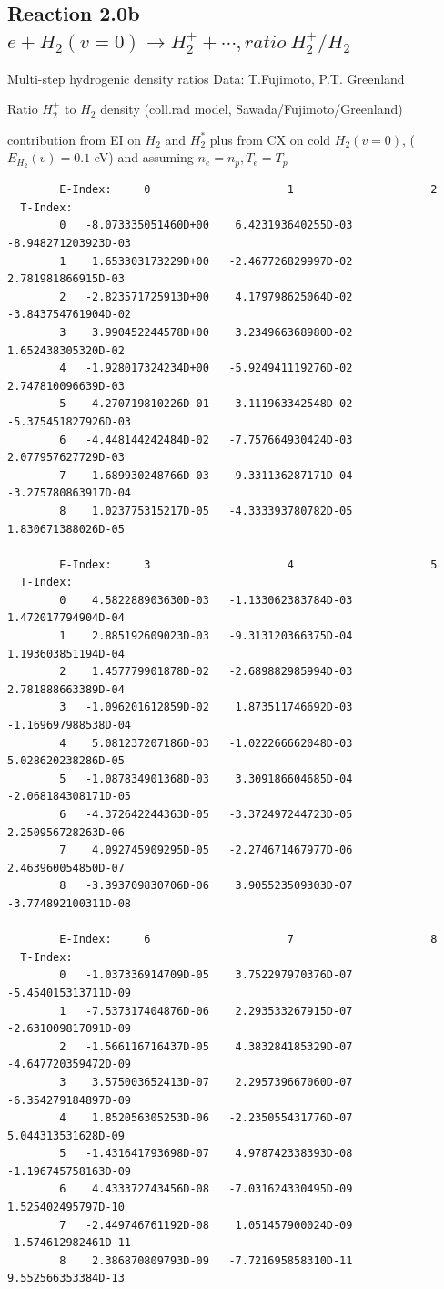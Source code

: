 \documentclass[12pt,dvips]{article}
\begin{document}
\newpage
\subsection{
Reaction 2.0b $e + H_2(v=0) \rightarrow H_2^+ + \cdots , ratio  \ H_2^+/H_2$
}

 Multi-step hydrogenic density ratios
 Data: T.Fujimoto, P.T. Greenland


  Ratio $H_2^+$ to $H_2$ density
  (coll.rad model, Sawada/Fujimoto/Greenland)

  contribution from  EI on $H_2$ and $H_2^*$  plus from CX on cold $H_2(v=0)$,
($E_{H_2}(v)=0.1$ eV) and assuming $n_e=n_p, T_e=T_p$


\begin{small}\begin{verbatim}
        E-Index:     0                     1                     2
  T-Index:
        0   -8.073335051460D+00    6.423193640255D-03   -8.948271203923D-03
        1    1.653303173229D+00   -2.467726829997D-02    2.781981866915D-03
        2   -2.823571725913D+00    4.179798625064D-02   -3.843754761904D-02
        3    3.990452244578D+00    3.234966368980D-02    1.652438305320D-02
        4   -1.928017324234D+00   -5.924941119276D-02    2.747810096639D-03
        5    4.270719810226D-01    3.111963342548D-02   -5.375451827926D-03
        6   -4.448144242484D-02   -7.757664930424D-03    2.077957627729D-03
        7    1.689930248766D-03    9.331136287171D-04   -3.275780863917D-04
        8    1.023775315217D-05   -4.333393780782D-05    1.830671388026D-05

        E-Index:     3                     4                     5
  T-Index:
        0    4.582288903630D-03   -1.133062383784D-03    1.472017794904D-04
        1    2.885192609023D-03   -9.313120366375D-04    1.193603851194D-04
        2    1.457779901878D-02   -2.689882985994D-03    2.781888663389D-04
        3   -1.096201612859D-02    1.873511746692D-03   -1.169697988538D-04
        4    5.081237207186D-03   -1.022266662048D-03    5.028620238286D-05
        5   -1.087834901368D-03    3.309186604685D-04   -2.068184308171D-05
        6   -4.372642244363D-05   -3.372497244723D-05    2.250956728263D-06
        7    4.092745909295D-05   -2.274671467977D-06    2.463960054850D-07
        8   -3.393709830706D-06    3.905523509303D-07   -3.774892100311D-08

        E-Index:     6                     7                     8
  T-Index:
        0   -1.037336914709D-05    3.752297970376D-07   -5.454015313711D-09
        1   -7.537317404876D-06    2.293533267915D-07   -2.631009817091D-09
        2   -1.566116716437D-05    4.383284185329D-07   -4.647720359472D-09
        3    3.575003652413D-07    2.295739667060D-07   -6.354279184897D-09
        4    1.852056305253D-06   -2.235055431776D-07    5.044313531628D-09
        5   -1.431641793698D-07    4.978742338393D-08   -1.196745758163D-09
        6    4.433372743456D-08   -7.031624330495D-09    1.525402495797D-10
        7   -2.449746761192D-08    1.051457900024D-09   -1.574612982461D-11
        8    2.386870809793D-09   -7.721695858310D-11    9.552566353384D-13


\end{verbatim}
\end{small}
\end{document}
